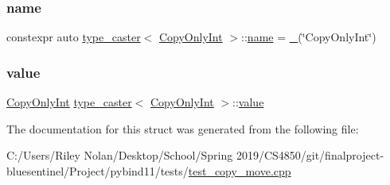 \subsubsection{\texorpdfstring{name}{name}}
{\footnotesize\ttfamily constexpr auto \mbox{\hyperlink{classtype__caster}{type\+\_\+caster}}$<$ \mbox{\hyperlink{class_copy_only_int}{Copy\+Only\+Int}} $>$\+::\mbox{\hyperlink{structname}{name}} = \mbox{\hyperlink{descr_8h_af114703e20c6527e87163eb2798f74b8}{\+\_\+}}(\char`\"{}Copy\+Only\+Int\char`\"{})\hspace{0.3cm}{\ttfamily [static]}}

\mbox{\label{structtype__caster_3_01_copy_only_int_01_4_a9c13bec252988adc1855d774068c2020}} 
\subsubsection{\texorpdfstring{value}{value}}
{\footnotesize\ttfamily \mbox{\hyperlink{class_copy_only_int}{Copy\+Only\+Int}} \mbox{\hyperlink{classtype__caster}{type\+\_\+caster}}$<$ \mbox{\hyperlink{class_copy_only_int}{Copy\+Only\+Int}} $>$\+::\mbox{\hyperlink{_s_d_l__opengl__glext_8h_a8ad81492d410ff2ac11f754f4042150f}{value}}\hspace{0.3cm}{\ttfamily [protected]}}



The documentation for this struct was generated from the following file\+:\begin{DoxyCompactItemize}
\item 
C\+:/\+Users/\+Riley Nolan/\+Desktop/\+School/\+Spring 2019/\+C\+S4850/git/finalproject-\/bluesentinel/\+Project/pybind11/tests/\mbox{\hyperlink{test__copy__move_8cpp}{test\+\_\+copy\+\_\+move.\+cpp}}\end{DoxyCompactItemize}
